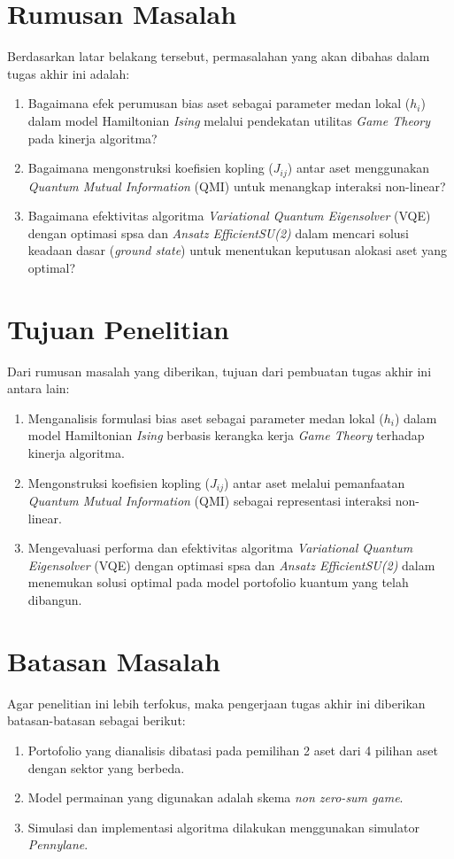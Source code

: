 \section{Rumusan Masalah}
Berdasarkan latar belakang tersebut, permasalahan yang akan dibahas dalam tugas akhir ini adalah:
\begin{enumerate}
    \item Bagaimana efek perumusan bias aset sebagai parameter medan lokal ($h_i$) dalam model Hamiltonian \textit{Ising} melalui pendekatan utilitas \textit{Game Theory} pada kinerja algoritma?
    \item Bagaimana mengonstruksi koefisien kopling ($J_{ij}$) antar aset menggunakan \textit{Quantum Mutual Information} (QMI) untuk menangkap interaksi non-linear?
    \item Bagaimana efektivitas algoritma \textit{Variational Quantum Eigensolver} (VQE) dengan optimasi spsa dan \textit{Ansatz EfficientSU(2)}  dalam mencari solusi keadaan dasar (\textit{ground state}) untuk menentukan keputusan alokasi aset yang optimal?
\end{enumerate}

\section{Tujuan Penelitian}
Dari rumusan masalah yang diberikan, tujuan dari pembuatan tugas akhir ini antara lain:
\begin{enumerate}
    \item Menganalisis formulasi bias aset sebagai parameter medan lokal ($h_i$) dalam model Hamiltonian \textit{Ising} berbasis kerangka kerja \textit{Game Theory} terhadap kinerja algoritma.
    \item Mengonstruksi koefisien kopling ($J_{ij}$) antar aset melalui pemanfaatan \textit{Quantum Mutual Information} (QMI) sebagai representasi interaksi non-linear.
    \item Mengevaluasi performa dan efektivitas algoritma \textit{Variational Quantum Eigensolver} (VQE) dengan optimasi spsa dan \textit{Ansatz EfficientSU(2)} dalam menemukan solusi optimal pada model portofolio kuantum yang telah dibangun.
\end{enumerate}

\section{Batasan Masalah}
Agar penelitian ini lebih terfokus, maka pengerjaan tugas akhir ini diberikan batasan-batasan sebagai berikut:
\begin{enumerate}
    \item Portofolio yang dianalisis dibatasi pada pemilihan 2 aset dari 4 pilihan aset dengan sektor yang berbeda.
    \item Model permainan yang digunakan adalah skema \textit{non zero-sum game}.
    \item Simulasi dan implementasi algoritma dilakukan menggunakan simulator \textit{Pennylane}.
\end{enumerate}

